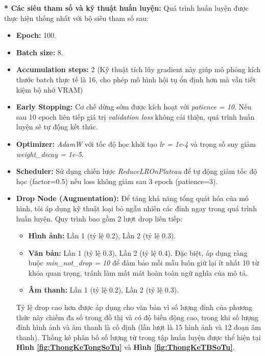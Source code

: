 \textbf{* Các siêu tham số và kỹ thuật huấn luyện:}
Quá trình huấn luyện được thực hiện thống nhất với bộ siêu tham số sau:
\begin{itemize}[label={--}, itemsep=1pt]
    \item \textbf{Epoch:} 100.
    \item \textbf{Batch size:} 8.
    \item \textbf{Accumulation steps:} 2 (Kỹ thuật tích lũy gradient này giúp mô phỏng kích thước batch thực tế là 16, cho phép mô hình hội tụ ổn định hơn mà vẫn tiết kiệm bộ nhớ VRAM)
    \item \textbf{Early Stopping:} Cơ chế dừng sớm được kích hoạt với \textit{patience = 10}. Nếu sau 10 epoch liên tiếp giá trị \textit{validation loss} không cải thiện, quá trình huấn luyện sẽ tự động kết thúc.
    \item \textbf{Optimizer:} \textit{AdamW} với tốc độ học khởi tạo \textit{lr = 1e-4} và trọng số suy giảm \textit{weight\_decay = 1e-5}.
    \item \textbf{Scheduler:} Sử dụng chiến lược \textit{ReduceLROnPlateau} để tự động giảm tốc độ học (factor=0.5) nếu loss không giảm sau 3 epoch (patience=3).
    \item \textbf{Drop Node (Augmentation):} Để tăng khả năng tổng quát hóa của mô hình, tôi áp dụng kỹ thuật loại bỏ ngẫu nhiên các đỉnh ngay trong quá trình huấn luyện. Quy trình bao gồm 2 lượt drop liên tiếp:
    \begin{itemize}[label={+}, itemsep=1pt]
        \item \textbf{Hình ảnh:} Lần 1 (tỷ lệ 0.2), Lần 2 (tỷ lệ 0.3).
        \item \textbf{Văn bản:} Lần 1 (tỷ lệ 0.3), Lần 2 (tỷ lệ 0.4). Đặc biệt, áp dụng ràng buộc \textit{min\_not\_drop = 10} để đảm bảo mỗi mẫu luôn giữ lại ít nhất 10 từ khóa quan trọng, tránh làm mất mát hoàn toàn ngữ nghĩa của mô tả.
        \item \textbf{Âm thanh:} Lần 1 (tỷ lệ 0.2), Lần 2 (tỷ lệ 0.3).
    \end{itemize}
    Tỷ lệ drop cao hơn được áp dụng cho văn bản vì số lượng đỉnh của phương thức này chiếm đa số trong đồ thị và có độ biến động cao, trong khi số lượng đỉnh hình ảnh và âm thanh là cố định (lần lượt là 15 hình ảnh và 12 đoạn âm thanh). Thống kê phân bố số lượng từ trong tập huấn luyện được thể hiện tại \textbf{Hình \ref{fig:ThongKeTongSoTu}} và \textbf{Hình \ref{fig:ThongKeTBSoTu}}.
\end{itemize}

